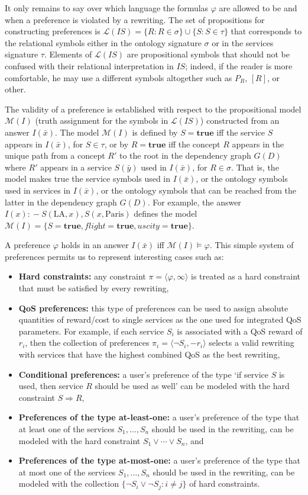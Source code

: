 \documentclass{llncs}
\newcommand{\tup}[1]{\langle #1 \rangle}
\newcommand{\qrule}{:\!\!-}
\renewcommand{\L}{\mathcal{L}}
\newcommand{\M}{\mathcal{M}}
\newcommand{\flight}{\textit{flight}}
\newcommand{\UScity}{\textit{uscity}}
\newcommand{\PA}{\text{Paris}}
\newcommand{\LA}{\text{LA}}
\begin{document}
It only remains to say over which language the formulas $\varphi$
are allowed to be and when a preference is violated by a rewriting.
The set of propositions for constructing preferences is
$\L(IS)=\{ R : R\in\sigma \} \cup \{S : S\in\tau \}$ that corresponds
to the relational symbols either in the ontology signature $\sigma$
or in the services signature $\tau$. Elements of $\L(IS)$ are
propositional symbols that should not be confused with their
relational interpretation in $IS$; indeed, if the reader
is more comfortable, he may use a different symbols altogether
such as $P_R$, $[R]$, or other.

The validity of a preference is established with respect to the
propositional model $\M(I)$ (truth assignment for the symbols in $\L(IS)$)
constructed from an answer $I(\bar x)$.
The model $\M(I)$ is defined by $S=\textbf{true}$ iff the service
$S$ appears in $I(\bar x)$, for $S\in\tau$, or by $R=\textbf{true}$
iff the concept $R$ appears in the unique path from a concept 
$R'$ to the root in the dependency graph $G(D)$ where $R'$ appears
in a service $S(\bar y)$ used in $I(\bar x)$, for $R\in\sigma$.
That is, the model makes true the service symbols used in
$I(\bar x)$, or the ontology symbols used in services in $I(\bar x)$,
or the ontology symbols that can be reached from the latter in
the dependency graph $G(D)$.
For example, the answer $I(x)\qrule S(\LA,x),S(x,\PA)$ defines
the model $\M(I)=\{S=\textbf{true},\flight=\textbf{true},\UScity=\textbf{true}\}$.

A preference $\varphi$ holds in an answer $I(\bar x)$ iff
$\M(I)\vDash\varphi$. This simple system of preferences permits
us to represent interesting cases such as:
\begin{itemize}
\item \textbf{Hard constraints:} any constraint $\pi=\tup{\varphi,\infty}$
is treated as a hard constraint that must be satisfied by every rewriting,
\item \textbf{QoS preferences:} this type of preferences can be used to
assign absolute quantities of reward/cost to single services as the one
used for integrated QoS parameters. For example, if each service $S_i$
is associated with a QoS reward of $r_i$, then the collection of preferences
$\pi_i=\tup{\neg S_i,-r_i}$ selects a valid rewriting with services that
have the highest combined QoS as the best rewriting,
\item \textbf{Conditional preferences:} a user's preference of the type
`if service $S$ is used, then service $R$ should be used as well' can be
modeled with the hard constraint $S \Rightarrow R$,
\item \textbf{Preferences of the type at-least-one:} a user's preference
of the type that at least one of the services $S_1,\ldots,S_n$ should be
used in the rewriting, can be modeled with the hard constraint $S_1\lor\cdots\lor S_n$, and
\item \textbf{Preferences of the type at-most-one:} a user's preference
of the type that at most one of the services $S_1,\ldots,S_n$ should be
used in the rewriting, can be modeled with the collection
$\{\neg S_i\lor\neg S_j: i\neq j\}$ of hard constraints.
\end{itemize}
\end{document}
